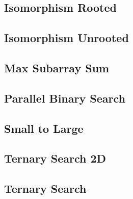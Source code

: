 \subsection{Isomorphism Rooted}
\raggedbottom
\hrulefill
\subsection{Isomorphism Unrooted}
\raggedbottom
\hrulefill
\subsection{Max Subarray Sum}
\raggedbottom
\hrulefill
\subsection{Parallel Binary Search}
\raggedbottom
\hrulefill
\subsection{Small to Large}
\raggedbottom
\hrulefill
\subsection{Ternary Search 2D}
\raggedbottom
\hrulefill
\subsection{Ternary Search}
\raggedbottom
\hrulefill

